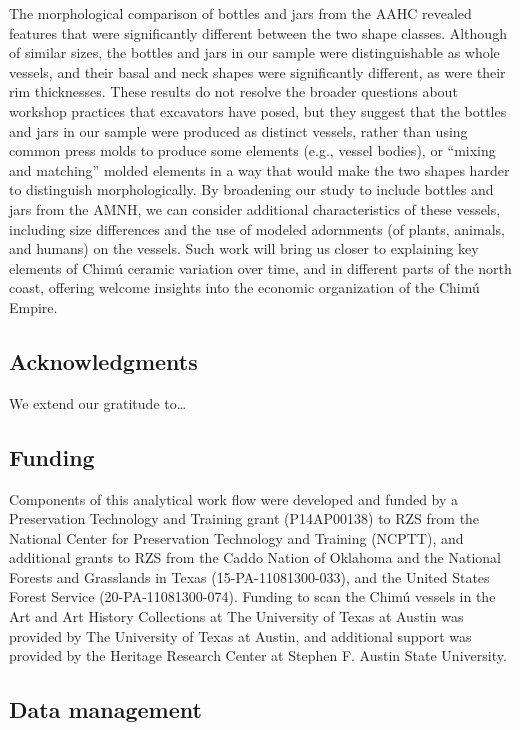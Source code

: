 \documentclass[]{interact}
\theoremstyle{plain}%
\theoremstyle{definition}
\theoremstyle{remark}
\begin{document}
The morphological comparison of bottles and jars from the AAHC revealed
features that were significantly different between the two shape
classes. Although of similar sizes, the bottles and jars in our sample
were distinguishable as whole vessels, and their basal and neck shapes
were significantly different, as were their rim thicknesses. These
results do not resolve the broader questions about workshop practices
that excavators have posed, but they suggest that the bottles and jars
in our sample were produced as distinct vessels, rather than using
common press molds to produce some elements (e.g., vessel bodies), or
``mixing and matching'' molded elements in a way that would make the two
shapes harder to distinguish morphologically. By broadening our study to
include bottles and jars from the AMNH, we can consider additional
characteristics of these vessels, including size differences and the use
of modeled adornments (of plants, animals, and humans) on the vessels.
Such work will bring us closer to explaining key elements of Chimú
ceramic variation over time, and in different parts of the north coast,
offering welcome insights into the economic organization of the Chimú
Empire.

\hypertarget{acknowledgments}{%
\subsection{Acknowledgments}\label{acknowledgments}}

We extend our gratitude to\ldots{}

\hypertarget{funding}{%
\subsection{Funding}\label{funding}}

Components of this analytical work flow were developed and funded by a
Preservation Technology and Training grant (P14AP00138) to RZS from the
National Center for Preservation Technology and Training (NCPTT), and
additional grants to RZS from the Caddo Nation of Oklahoma and the
National Forests and Grasslands in Texas (15-PA-11081300-033), and the
United States Forest Service (20-PA-11081300-074). Funding to scan the
Chimú vessels in the Art and Art History Collections at The University
of Texas at Austin was provided by The University of Texas at Austin,
and additional support was provided by the Heritage Research Center at
Stephen F. Austin State University.

\hypertarget{data-management}{%
\subsection{Data management}\label{data-management}}
\end{document}
